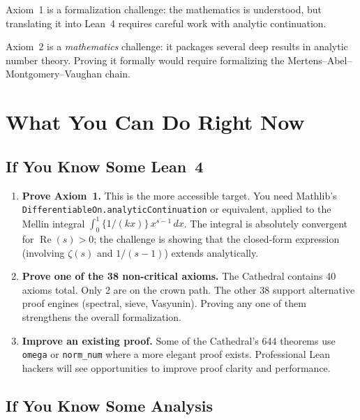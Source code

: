 \documentclass[11pt,a4paper]{article}
\begin{document}
Axiom~1 is a formalization challenge: the mathematics is understood,
but translating it into Lean~4 requires careful work with analytic
continuation.

Axiom~2 is a \emph{mathematics} challenge: it packages several
deep results in analytic number theory. Proving it formally would
require formalizing the Mertens--Abel--Montgomery--Vaughan chain.

\section*{What You Can Do Right Now}

\subsection*{If You Know Some Lean~4}

\begin{enumerate}
  \item \textbf{Prove Axiom~1.} This is the more accessible target.
    You need Mathlib's \texttt{DifferentiableOn.analyticContinuation}
    or equivalent, applied to the Mellin integral
    $\int_0^1 \{1/(kx)\}\,x^{s-1}\,dx$. The integral is absolutely
    convergent for $\operatorname{Re}(s) > 0$; the challenge is
    showing that the closed-form expression (involving $\zeta(s)$
    and $1/(s-1)$) extends analytically.

  \item \textbf{Prove one of the 38 non-critical axioms.} The
    Cathedral contains 40 axioms total. Only 2 are on the crown
    path. The other 38 support alternative proof engines (spectral,
    sieve, Vasyunin). Proving any one of them strengthens the
    overall formalization.

  \item \textbf{Improve an existing proof.} Some of the Cathedral's
    644 theorems use \texttt{omega} or \texttt{norm\_num} where
    a more elegant proof exists. Professional Lean hackers will
    see opportunities to improve proof clarity and performance.
\end{enumerate}

\subsection*{If You Know Some Analysis}
\end{document}
